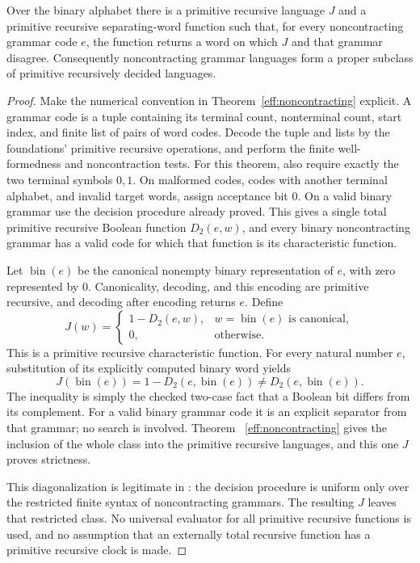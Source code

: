 \begin{theorem}\label{eff:nc-pr-separation}
Over the binary alphabet there is a primitive recursive language $J$ and
a primitive recursive separating-word function such that, for every
noncontracting grammar code $e$, the function returns a word on which $J$
and that grammar disagree.  Consequently noncontracting grammar languages
form a proper subclass of primitive recursively decided languages.
\end{theorem}
\begin{proof}
Make the numerical convention in Theorem~\ref{eff:noncontracting} explicit.
A grammar code is a tuple containing its terminal count, nonterminal count,
start index, and finite list of pairs of word codes.  Decode the tuple and
lists by the foundations' primitive recursive operations, and perform the
finite well-formedness and noncontraction tests.  For this theorem, also
require exactly the two terminal symbols $0,1$.  On malformed codes, codes
with another terminal alphabet, and invalid target words, assign acceptance
bit $0$.  On a valid binary grammar use the decision procedure already
proved.  This gives a single total primitive recursive Boolean function
$D_2(e,w)$, and every binary noncontracting grammar has a valid code for
which that function is its characteristic function.

Let $\operatorname{bin}(e)$ be the canonical nonempty binary representation
of $e$, with zero represented by $0$.  Canonicality, decoding, and this
encoding are primitive recursive, and decoding after encoding returns $e$.
Define
\[
 J(w)=
 \begin{cases}
  1-D_2(e,w),&w=\operatorname{bin}(e)\text{ is canonical},\\
  0,&\text{otherwise}.
 \end{cases}
\]
This is a primitive recursive characteristic function.  For every natural
number $e$, substitution of its explicitly computed binary word yields
\[
 J(\operatorname{bin}(e))
     =1-D_2(e,\operatorname{bin}(e))
     \ne D_2(e,\operatorname{bin}(e)).
\]
The inequality is simply the checked two-case fact that a Boolean bit
differs from its complement.  For a valid binary grammar code it is an
explicit separator from that grammar; no search is involved.  Theorem~
\ref{eff:noncontracting} gives the inclusion of the whole class into the
primitive recursive languages, and this one $J$ proves strictness.

This diagonalization is legitimate in \ipra: the decision procedure is
uniform only over the restricted finite syntax of noncontracting grammars.
The resulting $J$ leaves that restricted class.  No universal evaluator for
all primitive recursive functions is used, and no assumption that an
externally total recursive function has a primitive recursive clock is
made.
\end{proof}

